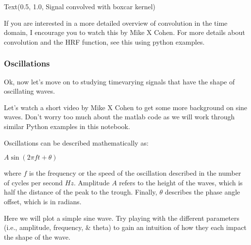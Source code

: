 \documentclass[letterpaper,10pt,english]{sphinxmanual}
\begin{document}
\begin{sphinxVerbatim}[commandchars=\\\{\}]
Text(0.5, 1.0, \PYGZsq{}Signal convolved with boxcar kernel\PYGZsq{})
\end{sphinxVerbatim}

\noindent{}

If you are interested in a more detailed overview of convolution in the time domain, I encourage you to watch this  by Mike X Cohen. For more details about convolution and the HRF function, see this  using python examples.


\subsubsection{Oscillations}
\label{\detokenize{content/Signal_Processing:oscillations}}
Ok, now let’s move on to studying time\sphinxhyphen{}varying signals that have the shape of oscillating waves.

Let’s watch a short video by Mike X Cohen to get some more background on sine waves. Don’t worry too much about the matlab code as we will work through similar Python examples in this notebook.

\begin{sphinxVerbatim}[commandchars=\\\{\}]
   

\end{sphinxVerbatim}

\noindent{}

Oscillations can be described mathematically as:

\(A\sin(2 \pi ft + \theta)\)

where \(f\) is the frequency or the speed of the oscillation described in the number of cycles per second \sphinxhyphen{} \(Hz\). Amplitude \(A\) refers to the height of the waves, which is half the distance of the peak to the trough. Finally, \(\theta\) describes the phase angle offset, which is in radians.

Here we will plot a simple sine wave.  Try playing with the different parameters (i.e., amplitude, frequency, \& theta) to gain an intuition of how they each impact the shape of the wave.
\end{document}
